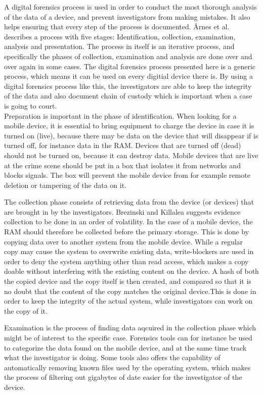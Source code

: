 
A digital forensics process is used in order to conduct the most thorough analysis of the data of a device, and prevent investigators from making mistakes. It also helps ensuring that every step of the process is documented. Årnes et al. describes a process with five stages: Identification, collection, examination, analysis and presentation\cite{DiFoBook}. The process in itself is an iterative process, and specifically the phases of collection, examination and analysis are done over and over again in some cases. The digital forensics process presented here is a generic process, which means it can be used on every digitial device there is. By using a digital forensics process like this, the investigators are able to keep the integrity of the data and also document chain of custody which is important when a case is going to court. \\

Preparation is important in the phase of identification. When looking for a mobile device, it is essential to bring equipment to charge the device in case it is turned on (live), because there may be data on the device that will disappear if is turned off, for instance data in the RAM. Devices that are turned off (dead) should not be turned on, because it can destroy data. Mobile devices that are live at the crime scene should be put in a box that isolates it from networks and blocks signals. The box will prevent the mobile device from for example remote deletion or tampering of the data on it\cite{DiFoBook}. 

The collection phase consists of retrieving data from the device (or devices) that are brought in by the investigators\cite{DiFoBook}. Brezinski and Killalea\cite{RFC3227} suggests evidence collection to be done in an order of volatility. In the case of a mobile device, the RAM should therefore be collected before the primary storage. This is done by copying data over to another system from the mobile device. While a regular copy may cause the system to overwrite existing data, write-blockers are used in order to deny the system anything other than read access, which makes a copy doable without interfering with the existing content on the device. A hash of both the copied device and the copy itself is then created, and compared so that it is no doubt that the content of the copy matches the original device\cite{DiFoBook}.This is done in order to keep the integrity of the actual system, while investigators can work on the copy of it. 

Examination is the process of finding data aqcuired in the collection phase which might be of interest to the specific case. Forensics tools can for instance be used to categorize the data found on the mobile device, and at the same time track what the investigator is doing. Some tools also offers the capability of automatically removing known files used by the operating system, which makes the process of filtering out gigabytes of date easier for the investigator of the device.

